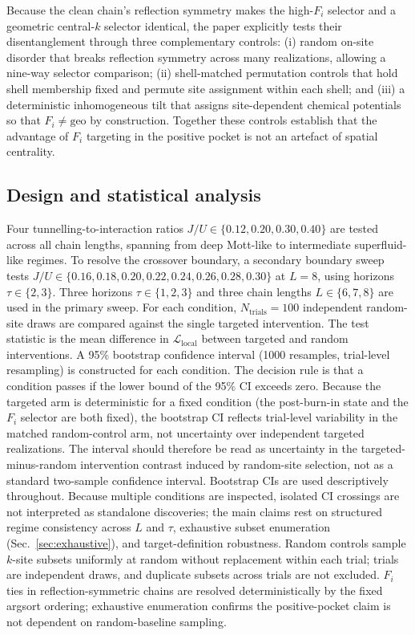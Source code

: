 \documentclass[aps,pra,reprint,amsmath,amssymb,longbibliography,floatfix]{revtex4-2}
\newcommand{\Fi}{F_i}
\begin{document}
Because the clean chain's reflection symmetry makes the high-$\Fi$ selector
and a geometric central-$k$ selector identical, the paper explicitly tests
their disentanglement through three complementary controls:
(i) random on-site disorder that breaks reflection symmetry across many
realizations, allowing a nine-way selector comparison;
(ii) shell-matched permutation controls that hold shell membership fixed and
permute site assignment within each shell; and
(iii) a deterministic inhomogeneous tilt that assigns site-dependent
chemical potentials so that $\Fi\neq\mathrm{geo}$ by construction.
Together these controls establish that the advantage of $\Fi$ targeting
in the positive pocket is not an artefact of spatial centrality.

\subsection{Design and statistical analysis}

Four tunnelling-to-interaction ratios $J/U\in\{0.12,0.20,0.30,0.40\}$ are
tested across all chain lengths, spanning from deep Mott-like to
intermediate superfluid-like regimes.
To resolve the crossover boundary, a secondary boundary sweep tests
$J/U\in\{0.16,0.18,0.20,0.22,0.24,0.26,0.28,0.30\}$ at $L=8$, using
horizons $\tau\in\{2,3\}$.
Three horizons $\tau\in\{1,2,3\}$ and three chain lengths $L\in\{6,7,8\}$
are used in the primary sweep.
For each condition, $N_{\mathrm{trials}}=100$ independent random-site draws
are compared against the single targeted intervention.
The test statistic is the mean difference in $\mathcal{L}_{\mathrm{local}}$
between targeted and random interventions.
A 95\% bootstrap confidence interval (1000 resamples, trial-level
resampling) is constructed for each condition.
The decision rule is that a condition passes if the lower bound of the
95\% CI exceeds zero.
Because the targeted arm is deterministic for a fixed condition (the
post-burn-in state and the $\Fi$ selector are both fixed), the bootstrap
CI reflects trial-level variability in the matched random-control arm,
not uncertainty over independent targeted realizations.
The interval should therefore be read as uncertainty in the
targeted-minus-random intervention contrast induced by random-site
selection, not as a standard two-sample confidence interval.
Bootstrap CIs are used descriptively throughout.
Because multiple conditions are inspected, isolated CI crossings are not
interpreted as standalone discoveries; the main claims rest on structured
regime consistency across $L$ and $\tau$, exhaustive subset enumeration
(Sec.~\ref{sec:exhaustive}), and target-definition robustness.
Random controls sample $k$-site subsets uniformly at random without
replacement within each trial; trials are independent draws, and duplicate
subsets across trials are not excluded.
$\Fi$ ties in reflection-symmetric chains are resolved deterministically
by the fixed argsort ordering; exhaustive enumeration confirms the
positive-pocket claim is not dependent on random-baseline sampling.
\end{document}
